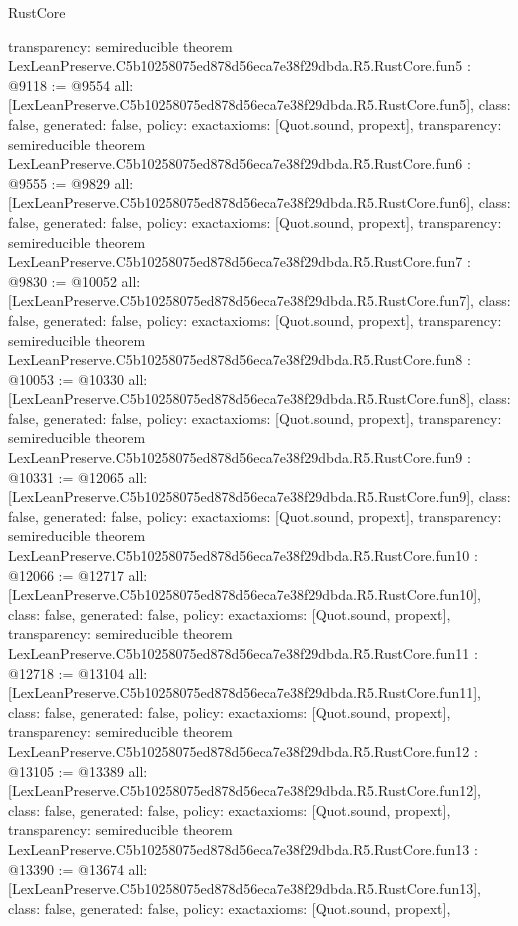 \begin{lexlean}{RustCore}
\begin{coremodule}
{  transparency: semireducible
}
theorem LexLeanPreserve.C5b10258075ed878d56eca7e38f29dbda.R5.RustCore.fun5 : @9118 := @9554 {
  all: [LexLeanPreserve.C5b10258075ed878d56eca7e38f29dbda.R5.RustCore.fun5],
  class: false,
  generated: false,
  policy: exact{axioms: [Quot.sound, propext]},
  transparency: semireducible
}
theorem LexLeanPreserve.C5b10258075ed878d56eca7e38f29dbda.R5.RustCore.fun6 : @9555 := @9829 {
  all: [LexLeanPreserve.C5b10258075ed878d56eca7e38f29dbda.R5.RustCore.fun6],
  class: false,
  generated: false,
  policy: exact{axioms: [Quot.sound, propext]},
  transparency: semireducible
}
theorem LexLeanPreserve.C5b10258075ed878d56eca7e38f29dbda.R5.RustCore.fun7 : @9830 := @10052 {
  all: [LexLeanPreserve.C5b10258075ed878d56eca7e38f29dbda.R5.RustCore.fun7],
  class: false,
  generated: false,
  policy: exact{axioms: [Quot.sound, propext]},
  transparency: semireducible
}
theorem LexLeanPreserve.C5b10258075ed878d56eca7e38f29dbda.R5.RustCore.fun8 : @10053 := @10330 {
  all: [LexLeanPreserve.C5b10258075ed878d56eca7e38f29dbda.R5.RustCore.fun8],
  class: false,
  generated: false,
  policy: exact{axioms: [Quot.sound, propext]},
  transparency: semireducible
}
theorem LexLeanPreserve.C5b10258075ed878d56eca7e38f29dbda.R5.RustCore.fun9 : @10331 := @12065 {
  all: [LexLeanPreserve.C5b10258075ed878d56eca7e38f29dbda.R5.RustCore.fun9],
  class: false,
  generated: false,
  policy: exact{axioms: [Quot.sound, propext]},
  transparency: semireducible
}
theorem LexLeanPreserve.C5b10258075ed878d56eca7e38f29dbda.R5.RustCore.fun10 : @12066 := @12717 {
  all: [LexLeanPreserve.C5b10258075ed878d56eca7e38f29dbda.R5.RustCore.fun10],
  class: false,
  generated: false,
  policy: exact{axioms: [Quot.sound, propext]},
  transparency: semireducible
}
theorem LexLeanPreserve.C5b10258075ed878d56eca7e38f29dbda.R5.RustCore.fun11 : @12718 := @13104 {
  all: [LexLeanPreserve.C5b10258075ed878d56eca7e38f29dbda.R5.RustCore.fun11],
  class: false,
  generated: false,
  policy: exact{axioms: [Quot.sound, propext]},
  transparency: semireducible
}
theorem LexLeanPreserve.C5b10258075ed878d56eca7e38f29dbda.R5.RustCore.fun12 : @13105 := @13389 {
  all: [LexLeanPreserve.C5b10258075ed878d56eca7e38f29dbda.R5.RustCore.fun12],
  class: false,
  generated: false,
  policy: exact{axioms: [Quot.sound, propext]},
  transparency: semireducible
}
theorem LexLeanPreserve.C5b10258075ed878d56eca7e38f29dbda.R5.RustCore.fun13 : @13390 := @13674 {
  all: [LexLeanPreserve.C5b10258075ed878d56eca7e38f29dbda.R5.RustCore.fun13],
  class: false,
  generated: false,
  policy: exact{axioms: [Quot.sound, propext]},
}
\end{coremodule}
\end{lexlean}
